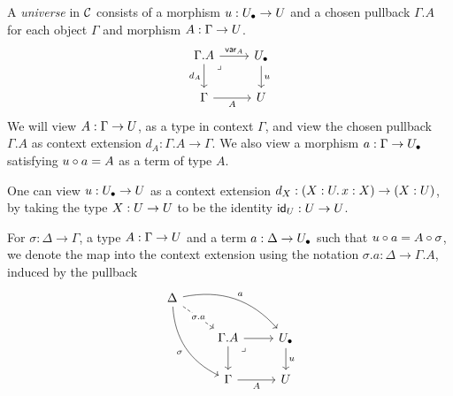 \begin{definition}
  \label{def:elementary-universe}
  A \emph{universe}
  in $\mathcal{C}$ consists of a morphism
  ${u} : {U_\bullet} \to U$
  and a chosen pullback $\Gamma . A$
  for each object $\Gamma$ and morphism $A : \Gamma \to U$.
  \[\begin{tikzcd}
	{\Gamma.A} & \Ulow \\
	\Gamma & \U
	\arrow["\var_A", from=1-1, to=1-2]
	\arrow["d_A", swap, from=1-1, to=2-1]
	\arrow["\lrcorner"{anchor=center, pos=0.125}, draw=none, from=1-1, to=2-2]
	\arrow["\uu", from=1-2, to=2-2]
	\arrow["A"', from=2-1, to=2-2]
  \end{tikzcd}\]
  We will view $A : \Gamma \to U$,
  as a type in context $\Gamma$,
  and view the chosen pullback $\Gamma . A$
  as context extension $d_A : \Gamma . A \to \Gamma$.
  We also view a morphism $a : \Gamma \to {U_\bullet}$
  satisfying ${u} \circ a = A$ as a term of type $A$.
\end{definition}

One can view ${u} : {U_\bullet} \to U$ as a context extension
$d_X : (X : U.\,x : X) \to (X : U)$,
by taking the type $X : U \to U$ to be the identity
$\mathsf{id}_U : U \to U$.

\begin{definition}
  For $\sigma : \Delta \to \Gamma$,
  a type $A : \Gamma \to U$ and a term $a : \Delta \to {U_\bullet}$
  such that ${u} \circ a = A \circ \sigma$,
  we denote the map into the context extension
  using the notation
  $\sigma . a : \Delta \to \Gamma . A$,
  induced by the pullback
\[\begin{tikzcd}
	\Delta \\
	& {\Gamma.A} & \Ulow \\
	& \Gamma & \U
	\arrow["{\sigma.a}"{description}, dashed, from=1-1, to=2-2]
	\arrow["a", bend left, from=1-1, to=2-3]
	\arrow["\sigma"', bend right, from=1-1, to=3-2]
	\arrow[from=2-2, to=2-3]
	\arrow[from=2-2, to=3-2]
	\arrow["\lrcorner"{anchor=center, pos=0.125}, draw=none, from=2-2, to=3-3]
	\arrow["\uu", from=2-3, to=3-3]
	\arrow["A"', from=3-2, to=3-3]
\end{tikzcd}\]
\end{definition}

